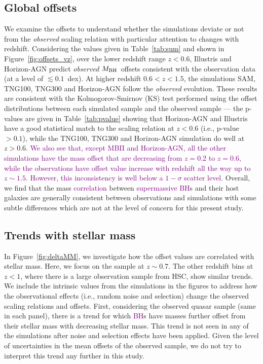 \documentclass[twocolumn]{aastex631}
\newcommand{\todo}[1]{\textcolor{red}{[{\bf TODO}: #1]}}
\newcommand{\red}[1]{\textcolor{purple}{#1}}
\def\mbh{$M_{\rm BH}$}
\begin{document}
\subsection{Global offsets}\label{subsec:offset}
We examine the offsets to understand whether the simulations deviate or not from the {\it observed} scaling relation with particular attention to changes with redshift. Considering the values given in Table~\ref{tab:sum} and shown in Figure~\ref{fig:offsets_vz}, over the lower redshift range $z<0.6$, Illustris and Horizon-AGN predict {\it observed} \mbh\ offsets consistent with the observation data (at a level of $\lesssim0.1$~dex). At higher redshift $0.6<z<1.5$, the simulations SAM, TNG100, TNG300 and Horizon-AGN follow the {\it observed} evolution. These results are consistent with the Kolmogorov-Smirnov (KS) test performed using the offset distributions between each simulated sample and the observed sample --- the p-values are given in Table~\ref{tab:pvalue} showing that Horizon-AGN and Illustris have a good statistical match to the scaling relation at $z<0.6$ (i.e., p-value $> 0.1$), while the TNG100, TNG300 and Horizon-AGN simulation do well at $z>0.6$. 
\red{We also see that, except MBII and Horizon-AGN, all the other simulations have the mass offset that are decreasing from $z=0.2$ to $z=0.6$, while the observations have offset value increase with redshift all the way up to $z\sim1.5$. However, this inconsistency is well below a $1-\sigma$ scatter level.}
Overall, we find that the mass \red{correlation} between \red{supermassive BH}s and their host galaxies are generally consistent between observations and simulations with some subtle differences which are not at the level of concern for this present study.


\subsection{Trends with stellar mass}
In Figure~\ref{fig:deltaMM}, we investigate how the offset values are correlated with stellar mass. Here, we focus on the sample at $z\sim0.7$. The other redshift bins at $z<1$, where there is a large observation sample from HSC, show similar trends. We include the intrinsic values from the simulations in the figures to address how the observational effects (i.e., random noise and selection) change the observed scaling relations and offsets. First, considering the observed quasar sample (same in each panel), there is a trend for which \red{BH}s have masses further offset from their stellar mass with decreasing stellar mass. This trend is not seen in any of the simulations after noise and selection effects have been applied. 
Given the level of uncertainties in the mean offsets of the observed sample, we do not try to interpret this trend any further in this study.
\end{document}
